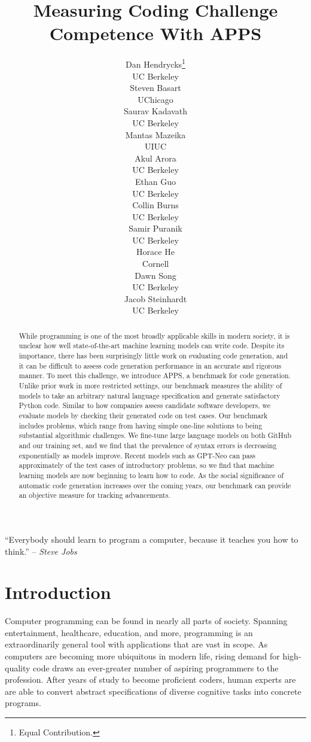 \documentclass{article}
\title{Measuring Coding Challenge Competence With APPS}
\date{}
\author{Dan Hendrycks\thanks{Equal Contribution.}\\
UC Berkeley\\
\And
Steven Basart\printfnsymbol{1}\\
UChicago\\
\And
Saurav Kadavath\\
UC Berkeley\\
\And
Mantas Mazeika\\
UIUC\\
\And
Akul Arora\\
UC Berkeley\\
\And
Ethan Guo\\
UC Berkeley\\
\And
Collin Burns\\
UC Berkeley\\
\And
Samir Puranik\\
UC Berkeley\\
\And
Horace He\\
Cornell\\
\AND
Dawn Song\\
UC Berkeley\\
\And
Jacob Steinhardt\\
UC Berkeley\\
}
\begin{document}
\maketitle



\begin{abstract}
While programming is one of the most broadly applicable skills in modern society, it is unclear how well state-of-the-art machine learning models can write code. Despite its importance, there has been surprisingly little work on evaluating code generation, and it can be difficult to assess code generation performance in an accurate and rigorous manner. To meet this challenge, we introduce APPS, a benchmark for code generation. Unlike prior work in more restricted settings, our benchmark measures the ability of models to take an arbitrary natural language specification and generate satisfactory Python code. Similar to how companies assess candidate software developers, we evaluate models by checking their generated code on test cases. Our benchmark includes  problems, which range from having simple one-line solutions to being substantial algorithmic challenges. We fine-tune large language models on both GitHub and our training set, and we find that the prevalence of syntax errors is decreasing exponentially as models improve. Recent models such as GPT-Neo can pass approximately  of the test cases of introductory problems, so we find that machine learning models are now beginning to learn how to code. As the social significance of automatic code generation increases over the coming years, our benchmark can provide an objective measure for tracking advancements.
\end{abstract}


``Everybody should learn to program a computer, because it teaches you how to think.'' -- \emph{Steve Jobs}

\section{Introduction}
Computer programming can be found in nearly all parts of society. Spanning entertainment, healthcare, education, and more, programming is an extraordinarily general tool with applications that are vast in scope. As computers are becoming more ubiquitous in modern life, rising demand for high-quality code draws an ever-greater number of aspiring programmers to the profession. After years of study to become proficient coders, human experts are are able to convert abstract specifications of diverse cognitive tasks into concrete programs.
\end{document}
